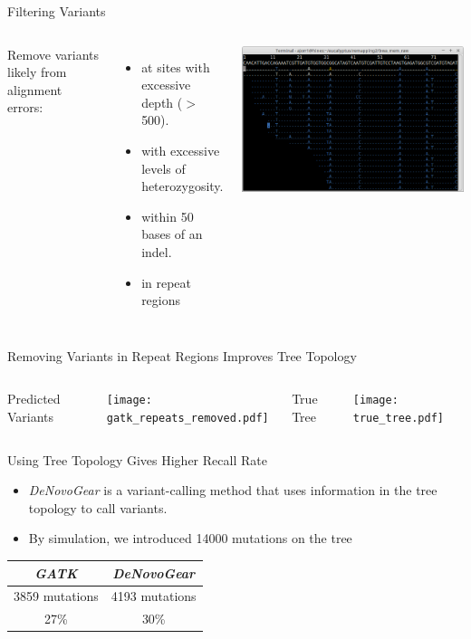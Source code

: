 \documentclass{beamer}
\begin{document}
\begin{frame}{Filtering Variants}
\begin{columns}
Remove variants likely from alignment errors:
\begin{itemize}
	\item at sites with excessive depth ($>$500).
	\item with excessive levels of heterozygosity.
	\item within 50 bases of an indel.
	\item in repeat regions 
\end{itemize}
\includegraphics[width=\linewidth]{coverage.png}
\end{columns}
\end{frame}


\begin{frame}{Removing Variants in Repeat Regions Improves Tree Topology}
	\begin{columns}
		\begin{center}
		Predicted Variants
		\end{center}
		\texttt{[image: gatk\_repeats\_removed.pdf]}
		\begin{center}
		True Tree
		\end{center}
		\texttt{[image: true\_tree.pdf]}
	\end{columns}
\end{frame}

\begin{frame}{Using Tree Topology Gives Higher Recall Rate}
	\begin{itemize}
	\item \textit{DeNovoGear} is a variant-calling method that uses information in the tree topology to call variants.
	\item By simulation, we introduced 14000 mutations on the tree
	\end{itemize}
	\begin{center}
	\begin{tabular}{ c | c }
	\textit{GATK} & \textit{DeNovoGear} \\
	\hline
	3859 mutations & 4193 mutations \\
	27\% & 30\%
	\end{tabular}
	\end{center}
\end{frame}
\end{document}
